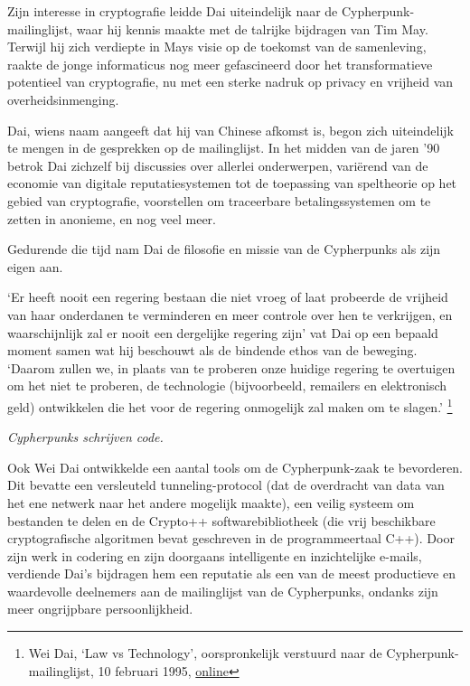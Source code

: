 \documentclass[smalldemyvopaper,11pt,twoside,onecolumn,openright,extrafontsizes,hidelinks]{memoir}
\begin{document}
Zijn interesse in cryptografie leidde Dai uiteindelijk naar de
Cypherpunk-mailinglijst, waar hij kennis maakte met de talrijke
bijdragen van Tim May. Terwijl hij zich verdiepte in Mays visie op de
toekomst van de samenleving, raakte de jonge informaticus nog meer
gefascineerd door het transformatieve potentieel van cryptografie, nu
met een sterke nadruk op privacy en vrijheid van overheidsinmenging.

Dai, wiens naam aangeeft dat hij van Chinese afkomst is, begon zich
uiteindelijk te mengen in de gesprekken op de mailinglijst. In het
midden van de jaren '90 betrok Dai zichzelf bij discussies over allerlei
onderwerpen, variërend van de economie van digitale reputatiesystemen
tot de toepassing van speltheorie op het gebied van cryptografie,
voorstellen om traceerbare betalingssystemen om te zetten in anonieme,
en nog veel meer.

Gedurende die tijd nam Dai de filosofie en missie van de Cypherpunks als
zijn eigen aan.

`Er heeft nooit een regering bestaan die niet vroeg of laat probeerde de
vrijheid van haar onderdanen te verminderen en meer controle over hen te
verkrijgen, en waarschijnlijk zal er nooit een dergelijke regering zijn'
vat Dai op een bepaald moment samen wat hij beschouwt als de bindende
ethos van de beweging. `Daarom zullen we, in plaats van te proberen onze
huidige regering te overtuigen om het niet te proberen, de technologie
(bijvoorbeeld, remailers en elektronisch geld) ontwikkelen die het voor
de regering onmogelijk zal maken om te slagen.' \footnote{Wei Dai, `Law
  vs Technology', oorspronkelijk verstuurd naar de
  Cypherpunk-mailinglijst, 10 februari 1995,
  \href{https://cypherpunks.venona.com/date/1995/02/msg00508.html}{online}}

\emph{Cypherpunks schrijven code.}

Ook Wei Dai ontwikkelde een aantal tools om de Cypherpunk-zaak te
bevorderen. Dit bevatte een versleuteld tunneling-protocol (dat de
overdracht van data van het ene netwerk naar het andere mogelijk
maakte), een veilig systeem om bestanden te delen en de Crypto++
softwarebibliotheek (die vrij beschikbare cryptografische algoritmen
bevat geschreven in de programmeertaal C++). Door zijn werk in codering
en zijn doorgaans intelligente en inzichtelijke e-mails, verdiende Dai's
bijdragen hem een reputatie als een van de meest productieve en
waardevolle deelnemers aan de mailinglijst van de Cypherpunks, ondanks
zijn meer ongrijpbare persoonlijkheid.
\end{document}

